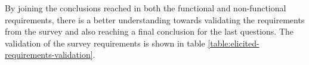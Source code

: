 By joining the conclusions reached in both the functional and non-functional requirements, there is a better understanding  towards validating the requirements from the survey and also reaching a final conclusion for the last questions. The validation of the survey requirements is shown in table \ref{table:elicited-requirements-validation}.

